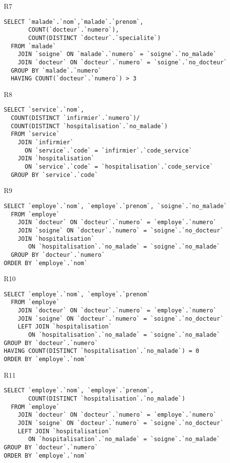 \begin{enumerate}
  \item[R7]
\begin{verbatim}
SELECT `malade`.`nom`,`malade`.`prenom`,
       COUNT(`docteur`.`numero`),
       COUNT(DISTINCT `docteur`.`specialite`)
  FROM `malade` 
    JOIN `soigne` ON `malade`.`numero` = `soigne`.`no_malade`
    JOIN `docteur` ON `docteur`.`numero` = `soigne`.`no_docteur`
  GROUP BY `malade`.`numero`
  HAVING COUNT(`docteur`.`numero`) > 3
\end{verbatim}

  \item[R8]
\begin{verbatim}
SELECT `service`.`nom`,
  COUNT(DISTINCT `infirmier`.`numero`)/
  COUNT(DISTINCT `hospitalisation`.`no_malade`) 
  FROM `service`
    JOIN `infirmier` 
      ON `service`.`code` = `infirmier`.`code_service` 
    JOIN `hospitalisation` 
      ON `service`.`code` = `hospitalisation`.`code_service`
  GROUP BY `service`.`code`
\end{verbatim}

  \item[R9]
\begin{verbatim}
SELECT `employe`.`nom`, `employe`.`prenom`, `soigne`.`no_malade`
  FROM `employe` 
    JOIN `docteur` ON `docteur`.`numero` = `employe`.`numero`
    JOIN `soigne` ON `docteur`.`numero` = `soigne`.`no_docteur`
    JOIN `hospitalisation`
       ON `hospitalisation`.`no_malade` = `soigne`.`no_malade`
  GROUP BY `docteur`.`numero`
ORDER BY `employe`.`nom`  
\end{verbatim}

  \item[R10]
\begin{verbatim}
SELECT `employe`.`nom`, `employe`.`prenom`
  FROM `employe` 
    JOIN `docteur` ON `docteur`.`numero` = `employe`.`numero`
    JOIN `soigne` ON `docteur`.`numero` = `soigne`.`no_docteur`
    LEFT JOIN `hospitalisation` 
       ON `hospitalisation`.`no_malade` = `soigne`.`no_malade`
GROUP BY `docteur`.`numero`
HAVING COUNT(DISTINCT `hospitalisation`.`no_malade`) = 0
ORDER BY `employe`.`nom`  
\end{verbatim}

  \item[R11]
\begin{verbatim}
SELECT `employe`.`nom`, `employe`.`prenom`,
       COUNT(DISTINCT `hospitalisation`.`no_malade`)
  FROM `employe` 
    JOIN `docteur` ON `docteur`.`numero` = `employe`.`numero`
    JOIN `soigne` ON `docteur`.`numero` = `soigne`.`no_docteur`
    LEFT JOIN `hospitalisation` 
       ON `hospitalisation`.`no_malade` = `soigne`.`no_malade`
GROUP BY `docteur`.`numero`
ORDER BY `employe`.`nom`  
\end{verbatim}


\end{enumerate}
